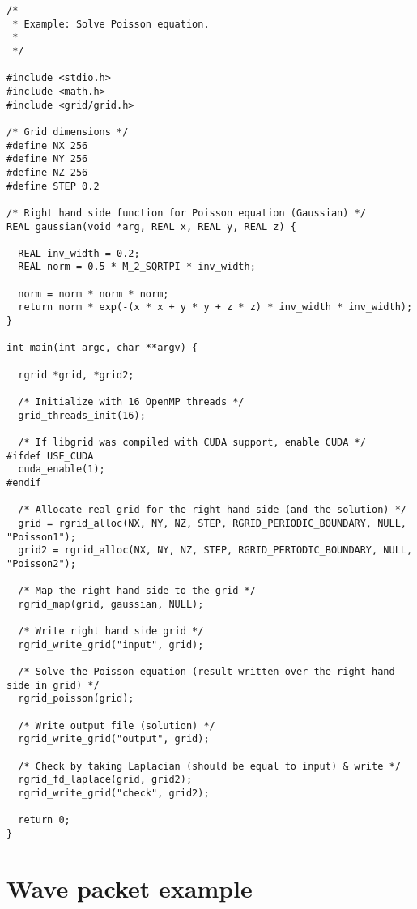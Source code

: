 \documentclass[12pt,letterpaper]{report}
\begin{document}
\begin{verbatim}
/*
 * Example: Solve Poisson equation.
 *
 */

#include <stdio.h>
#include <math.h>
#include <grid/grid.h>

/* Grid dimensions */
#define NX 256
#define NY 256
#define NZ 256
#define STEP 0.2

/* Right hand side function for Poisson equation (Gaussian) */
REAL gaussian(void *arg, REAL x, REAL y, REAL z) {

  REAL inv_width = 0.2;
  REAL norm = 0.5 * M_2_SQRTPI * inv_width;

  norm = norm * norm * norm;
  return norm * exp(-(x * x + y * y + z * z) * inv_width * inv_width);
}

int main(int argc, char **argv) {
  
  rgrid *grid, *grid2;
  
  /* Initialize with 16 OpenMP threads */
  grid_threads_init(16);

  /* If libgrid was compiled with CUDA support, enable CUDA */
#ifdef USE_CUDA
  cuda_enable(1);
#endif
  
  /* Allocate real grid for the right hand side (and the solution) */
  grid = rgrid_alloc(NX, NY, NZ, STEP, RGRID_PERIODIC_BOUNDARY, NULL, "Poisson1");
  grid2 = rgrid_alloc(NX, NY, NZ, STEP, RGRID_PERIODIC_BOUNDARY, NULL, "Poisson2");

  /* Map the right hand side to the grid */
  rgrid_map(grid, gaussian, NULL);

  /* Write right hand side grid */
  rgrid_write_grid("input", grid);

  /* Solve the Poisson equation (result written over the right hand side in grid) */
  rgrid_poisson(grid);  

  /* Write output file (solution) */
  rgrid_write_grid("output", grid);

  /* Check by taking Laplacian (should be equal to input) & write */
  rgrid_fd_laplace(grid, grid2);
  rgrid_write_grid("check", grid2);

  return 0;
}
\end{verbatim}

\section{Wave packet example}
\end{document}
